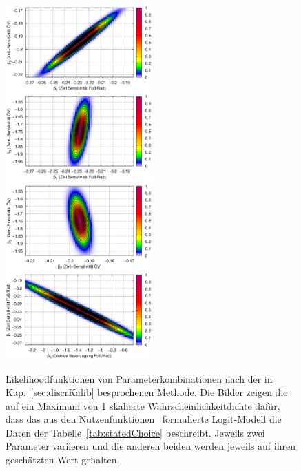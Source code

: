 \begin{figure}
\includegraphics[width=0.50\textwidth]{figsErh/VkoekSS09_statedChoice_Lbeta1beta2.eps}
\includegraphics[width=0.50\textwidth]{figsErh/VkoekSS09_statedChoice_Lbeta1beta3.eps}
\includegraphics[width=0.50\textwidth]{figsErh/VkoekSS09_statedChoice_Lbeta2beta3.eps}
\includegraphics[width=0.50\textwidth]{figsErh/VkoekSS09_statedChoice_Lbeta0beta1.eps}
\caption{\label{fig:statedChoice_beta} Likelihoodfunktionen von
Parameterkombinationen nach der in Kap.~\ref{sec:discrKalib}
besprochenen Methode. Die Bilder zeigen die auf ein Maximum von 1
skalierte Wahrscheinlichkeitdichte daf\"ur, dass das aus den
Nutzenfunktionen~ formulierte Logit-Modell die Daten der
Tabelle~\ref{tab:statedChoice} beschreibt. Jeweils zwei Parameter
variieren und die anderen beiden werden
jeweils auf ihren gesch\"atzten Wert gehalten.}
\end{figure}



